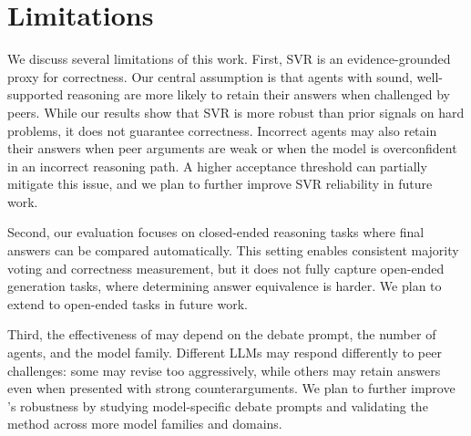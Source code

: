 \section*{Limitations}

We discuss several limitations of this work. First, SVR is an evidence-grounded proxy for correctness. Our central assumption is that agents with sound, well-supported reasoning are more likely to retain their answers when challenged by peers. While our results show that SVR is more robust than prior signals on hard problems, it does not guarantee correctness. Incorrect agents may also retain their answers when peer arguments are weak or when the model is overconfident in an incorrect reasoning path. A higher acceptance threshold can partially mitigate this issue, and we plan to further improve SVR reliability in future work.

Second, our evaluation focuses on closed-ended reasoning tasks where final answers can be compared automatically. This setting enables consistent majority voting and correctness measurement, but it does not fully capture open-ended generation tasks, where determining answer equivalence is harder. We plan to extend \sysname to open-ended tasks in future work.

Third, the effectiveness of \sysname may depend on the debate prompt, the number of agents, and the model family. Different LLMs may respond differently to peer challenges: some may revise too aggressively, while others may retain answers even when presented with strong counterarguments. We plan to further improve \sysname's robustness by studying model-specific debate prompts and validating the method across more model families and domains.
